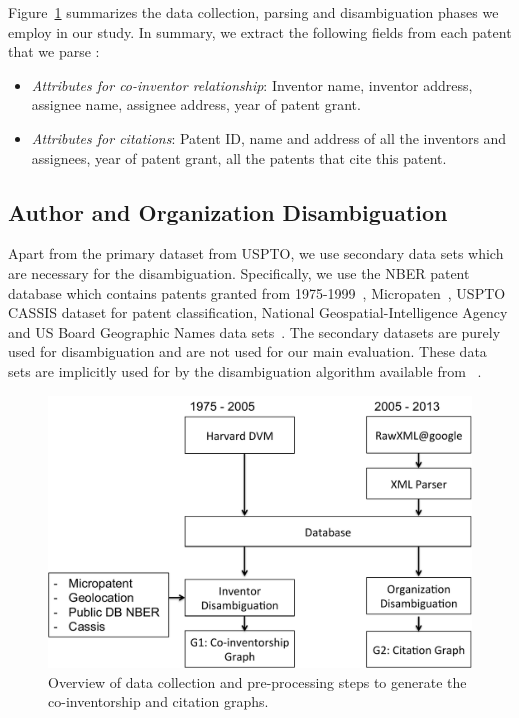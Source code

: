 Figure~\ref{process} summarizes the data collection, parsing and disambiguation phases we employ in our study.
In summary, we extract the following fields from each patent that we parse :

\begin{itemize}
\item {\em Attributes for co-inventor relationship}:
Inventor name, inventor address, assignee name, assignee address, year of patent grant.

\item {\em Attributes for citations}:
Patent ID, name and address of all the inventors and assignees, year of patent grant, all the patents that cite this patent.
\end{itemize}


\subsection{Author and Organization Disambiguation}

Apart from the primary dataset from USPTO, we use secondary data sets which are necessary for the disambiguation. Specifically, we use the NBER patent database which contains patents granted from 1975-1999~\cite{NBER}, Micropaten~\cite{micropatent}, USPTO CASSIS dataset for patent classification, National Geospatial-Intelligence Agency and US Board Geographic Names data sets~\cite{geocoding, geotable}. The secondary datasets are purely used for disambiguation and are not used for our main evaluation. These data sets are implicitly used for by the disambiguation algorithm available from ~\cite{disambiguation}.

\begin{figure}[H]
		  \centering	
          \includegraphics[scale=0.4]{figure/process.pdf}
          \caption{Overview of data collection and pre-processing steps to generate the co-inventorship and citation graphs.}
          \label{process}

\end{figure}


